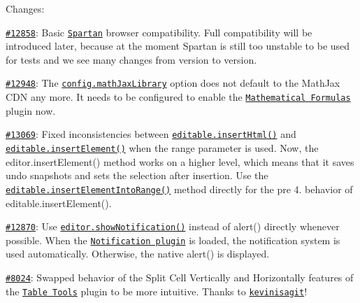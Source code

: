 Changes\+:


\begin{DoxyItemize}
\item \href{http://dev.ckeditor.com/ticket/12858}{\tt \#12858}\+: Basic \href{http://blogs.windows.com/bloggingwindows/2015/03/30/introducing-project-spartan-the-new-browser-built-for-windows-10/}{\tt Spartan} browser compatibility. Full compatibility will be introduced later, because at the moment Spartan is still too unstable to be used for tests and we see many changes from version to version.
\item \href{http://dev.ckeditor.com/ticket/12948}{\tt \#12948}\+: The \href{http://docs.ckeditor.com/#!/api/CKEDITOR.config-cfg-mathJaxLib}{\tt {\ttfamily config.\+math\+Jax\+Library}} option does not default to the Math\+Jax C\+DN any more. It needs to be configured to enable the \href{http://ckeditor.com/addon/mathjax}{\tt Mathematical Formulas} plugin now.
\item \href{http://dev.ckeditor.com/ticket/13069}{\tt \#13069}\+: Fixed inconsistencies between \href{http://docs.ckeditor.com/#!/api/CKEDITOR.editable-method-insertElement}{\tt {\ttfamily editable.\+insert\+Html()}} and \href{http://docs.ckeditor.com/#!/api/CKEDITOR.editable-method-insertElement}{\tt {\ttfamily editable.\+insert\+Element()}} when the {\ttfamily range} parameter is used. Now, the {\ttfamily editor.\+insert\+Element()} method works on a higher level, which means that it saves undo snapshots and sets the selection after insertion. Use the \href{http://docs.ckeditor.com/#!/api/CKEDITOR.editable-method-insertElementIntoRange}{\tt {\ttfamily editable.\+insert\+Element\+Into\+Range()}} method directly for the pre 4. behavior of {\ttfamily editable.\+insert\+Element()}.
\item \href{http://dev.ckeditor.com/ticket/12870}{\tt \#12870}\+: Use \href{http://docs.ckeditor.com/#!/api/CKEDITOR.editor-method-showNotification}{\tt {\ttfamily editor.\+show\+Notification()}} instead of {\ttfamily alert()} directly whenever possible. When the \href{http://ckeditor.com/addon/notification}{\tt Notification plugin} is loaded, the notification system is used automatically. Otherwise, the native {\ttfamily alert()} is displayed.
\item \href{http://dev.ckeditor.com/ticket/8024}{\tt \#8024}\+: Swapped behavior of the Split Cell Vertically and Horizontally features of the \href{http://ckeditor.com/addon/tabletools}{\tt Table Tools} plugin to be more intuitive. Thanks to \href{https://github.com/kevinisagit}{\tt kevinisagit}!

\end{DoxyItemize}
